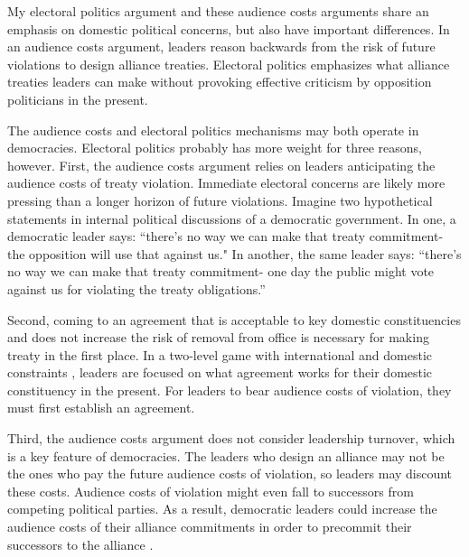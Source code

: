 \documentclass[12pt]{article}
\begin{document}
My electoral politics argument and these audience costs arguments share an emphasis on domestic political concerns, but also have important differences. 
In an audience costs argument, leaders reason backwards from the risk of future violations to design alliance treaties. 
Electoral politics emphasizes what alliance treaties leaders can make without provoking effective criticism by opposition politicians in the present. 
     

The audience costs and electoral politics mechanisms may both operate in democracies. 
Electoral politics probably has more weight for three reasons, however. 
First, the audience costs argument relies on leaders anticipating the audience costs of treaty violation.  
Immediate electoral concerns are likely more pressing than a longer horizon of future violations. 
Imagine two hypothetical statements in internal political discussions of a democratic government. 
In one, a democratic leader says: ``there's no way we can make that treaty commitment- the opposition will use that against us." 
In another, the same leader says: ``there's no way we can make that treaty commitment- one day the public might vote against us for violating the treaty obligations.'' 


Second, coming to an agreement that is acceptable to key domestic constituencies and does not increase the risk of removal from office is necessary for making treaty in the first place. 
In a two-level game with international and domestic constraints \citep{Putnam1988}, leaders are focused on what agreement works for their domestic constituency in the present. 
For leaders to bear audience costs of violation, they must first establish an agreement. 


Third, the audience costs argument does not consider leadership turnover, which is a key feature of democracies. 
The leaders who design an alliance may not be the ones who pay the future audience costs of violation, so leaders may discount these costs. 
Audience costs of violation might even fall to successors from competing political parties. 
As a result, democratic leaders could increase the audience costs of their alliance commitments in order to precommit their successors to the alliance \citep{Mattes2012a}. 
\end{document}
